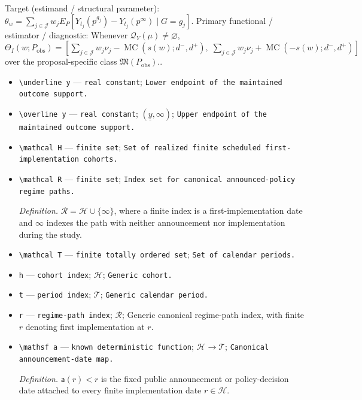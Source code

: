 \documentclass{article}
\begin{document}
Target (estimand / structural parameter): \(\theta_w=\sum_{j\in\mathcal J}w_jE_P[Y_{t_j}(p^{g_j})-Y_{t_j}(p^\infty)\mid G=g_j]\).
Primary functional / estimator / diagnostic: Whenever \(\mathcal Q_Y(\mu)\ne\varnothing\), \(\Theta_I(w;P_{\mathrm{obs}})=[\sum_{j\in\mathcal J}w_j\nu_j-\operatorname{MC}(s(w);d^-,d^+),\;\sum_{j\in\mathcal J}w_j\nu_j+\operatorname{MC}(-s(w);d^-,d^+)]\) over the proposal-specific class \(\mathfrak M(P_{\mathrm{obs}})\)..
\begin{itemize}
  \item \texttt{\textbackslash{}\allowbreak{}underline y} --- \texttt{real constant}; \texttt{Lower endpoint of the maintained outcome support.}
  \item \texttt{\textbackslash{}\allowbreak{}overline y} --- \texttt{real constant}; \((\underline y,\infty)\); \texttt{Upper endpoint of the maintained outcome support.}
  \item \texttt{\textbackslash{}\allowbreak{}mathcal H} --- \texttt{finite set}; \texttt{Set of realized finite scheduled first-\allowbreak{}implementation cohorts.}
  \item \texttt{\textbackslash{}\allowbreak{}mathcal R} --- \texttt{finite set}; \texttt{Index set for canonical announced-\allowbreak{}policy regime paths.}
  \par\smallskip\noindent\emph{Definition.} \(\mathcal R=\mathcal H\cup\{\infty\}\), where a finite index is a first-implementation date and \(\infty\) indexes the path with neither announcement nor implementation during the study.
  \item \texttt{\textbackslash{}\allowbreak{}mathcal T} --- \texttt{finite totally ordered set}; \texttt{Set of calendar periods.}
  \item \texttt{h} --- \texttt{cohort index}; \(\mathcal H\); \texttt{Generic cohort.}
  \item \texttt{t} --- \texttt{period index}; \(\mathcal T\); \texttt{Generic calendar period.}
  \item \texttt{r} --- \texttt{regime-\allowbreak{}path index}; \(\mathcal R\); Generic canonical regime-path index, with finite \(r\) denoting first implementation at \(r\).
  \item \texttt{\textbackslash{}\allowbreak{}mathsf a} --- \texttt{known deterministic function}; \(\mathcal H\to\mathcal T\); \texttt{Canonical announcement-\allowbreak{}date map.}
  \par\smallskip\noindent\emph{Definition.} \(\mathsf a(r)<r\) is the fixed public announcement or policy-decision date attached to every finite implementation date \(r\in\mathcal H\).

\end{itemize}
\end{document}
